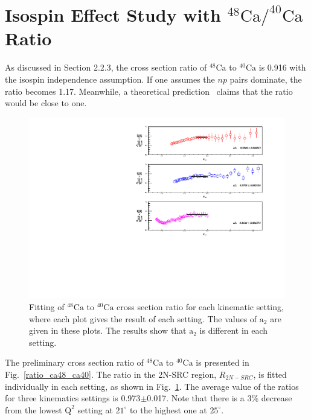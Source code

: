 \section{Isospin Effect Study with $\mathrm{^{48}Ca/^{40}Ca}$ Ratio}
 As discussed in Section 2.2.3, the cross section ratio of $\mathrm{^{48}Ca}$ to $\mathrm{^{40}Ca}$ is 0.916 with the isospin independence assumption. If one assumes the $np$ pairs dominate, the ratio becomes 1.17. Meanwhile, a theoretical prediction~\cite{PhysRevC.84.031302,PhysRevC.86.044619} claims that the ratio would be close to one. 

 \begin{figure}[!ht]
  \begin{center}
    \includegraphics[type=pdf,ext=.pdf,read=.pdf,width=1.0\textwidth]{./figures/xs/Ca48_Ca40_XS_Ratio_Fit}
    \caption[Fitting of $\mathrm{^{48}Ca}$ to $\mathrm{^{40}Ca}$ cross section ratio]{\footnotesize{Fitting of $\mathrm{^{48}Ca}$ to $\mathrm{^{40}Ca}$ cross section ratio for each kinematic setting, where each plot gives the result of each setting. The values of $\mathrm{a_{2}}$ are given in these plots. The results show that $\mathrm{a_{2}}$ is different in each setting.}}
    \label{ratio_ca48_ca40_fit}
  \end{center}
\end{figure} 

 The preliminary cross section ratio of $\mathrm{^{48}Ca}$ to $\mathrm{^{40}Ca}$ is presented in Fig.~\ref{ratio_ca48_ca40}. The ratio in the 2N-SRC region, $R_{2N-SRC}$, is fitted individually in each setting, as shown in Fig.~\ref{ratio_ca48_ca40_fit}. The average value of the ratios for three kinematics settings is 0.973$\pm$0.017. Note that there is a 3\% decrease from the lowest $\mathrm{Q^{2}}$ setting at $21^{\circ}$ to the highest one at $25^{\circ}$.
    
